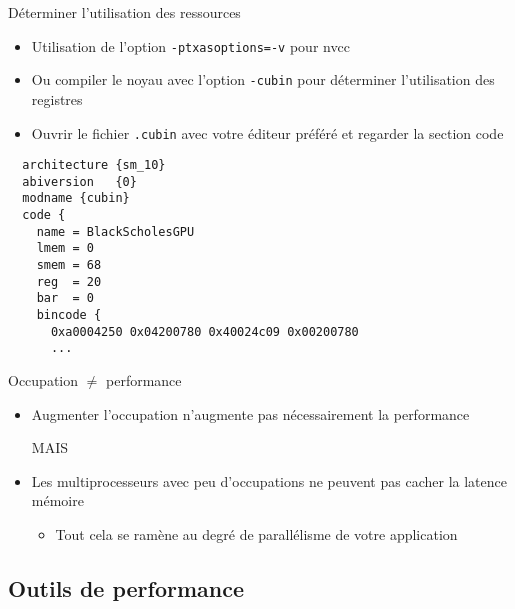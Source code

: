 \documentclass{beamer}
\begin{document}
\begin{frame}[containsverbatim]{Déterminer l'utilisation des ressources}

  \begin{itemize}
  \item Utilisation de l'option \texttt{-ptxasoptions=-v} pour nvcc
  \item Ou compiler le noyau avec l'option  \texttt{-cubin} pour 
    déterminer l'utilisation des registres
  \item Ouvrir le fichier \texttt{.cubin} avec votre éditeur préféré
    et regarder la section code
  \end{itemize}
  
  \begin{lstlisting}
  architecture {sm_10}
  abiversion   {0}
  modname {cubin}
  code {
    name = BlackScholesGPU
    lmem = 0
    smem = 68
    reg  = 20
    bar  = 0
    bincode {
      0xa0004250 0x04200780 0x40024c09 0x00200780
      ...
  \end{lstlisting}
\end{frame}

\begin{frame}{Occupation $\neq$ performance}

\begin{itemize}
\item Augmenter l'occupation n'augmente pas nécessairement la performance \\
  \begin{center}
    {\Large MAIS}
  \end{center}
\item Les multiprocesseurs avec peu d'occupations ne peuvent pas cacher la latence
  mémoire
  \begin{itemize}
  \item Tout cela se ramène au degré de parallélisme de votre application
  \end{itemize}
\end{itemize}
\end{frame}

\subsection{Outils de performance}
\end{document}
